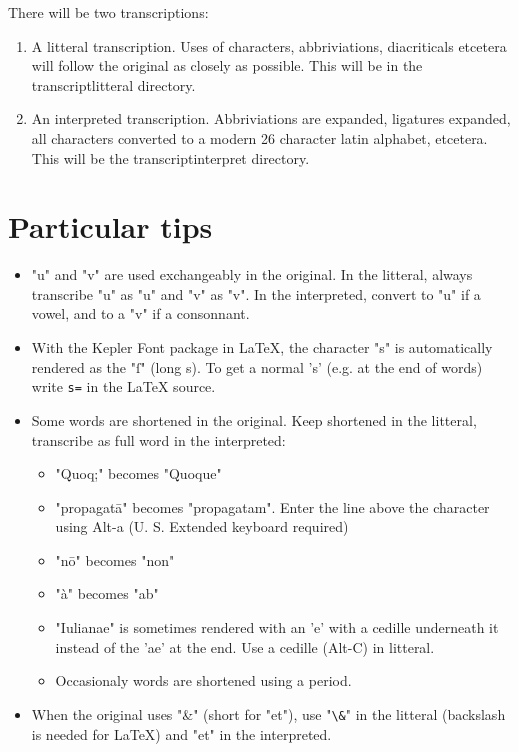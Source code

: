 \documentclass{report}
\begin{document}
There will be two transcriptions:
\begin{enumerate}
\item A litteral transcription. Uses of characters, abbriviations, diacriticals etcetera will follow the original as closely as possible. This will be in the transcriptlitteral directory.
\item An interpreted transcription. Abbriviations are expanded, ligatures expanded, all characters converted to a modern 26 character latin alphabet, etcetera. This will be the transcriptinterpret directory.
\end{enumerate}

\section{Particular tips}
\begin{itemize}
\item "u" and "v" are used exchangeably in the original. In the litteral, always transcribe "u" as "u" and "v" as "v". In the interpreted, convert to "u" if a vowel, and to a "v" if a consonnant.
\item With the Kepler Font package in LaTeX, the character "s" is automatically rendered as the "ſ" (long s). To get a normal 's' (e.g. at the end of words) write \verb"s=" in the LaTeX source.
\item Some words are shortened in the original.  Keep shortened in the litteral, transcribe as full word in the interpreted:
\begin{itemize}
\item "Quoq;" becomes "Quoque"
\item "propagatā" becomes "propagatam". Enter the line above the character using Alt-a (U. S. Extended keyboard required)
\item "nō" becomes "non"
\item "à" becomes "ab"
\item "Iulianae" is sometimes rendered with an 'e' with a cedille underneath it instead of the 'ae' at the end. Use a cedille (Alt-C) in litteral.
\item Occasionaly words are shortened using a period.
\end{itemize}
\item When the original uses "\&" (short for "et"), use "\verb+\&+" in the litteral (backslash is needed for LaTeX) and "et" in the interpreted.
\end{itemize}
\end{document}
